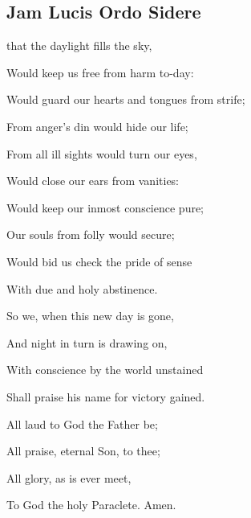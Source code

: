 \begin{multicols}{2}
\subsection{Jam Lucis Ordo Sidere}
\begin{hangparas}{1.25em}{1}
 that the daylight fills the sky,\par
{}\par\noindent
{}\par\noindent
Would keep us free from harm to-day:\\
\par\noindent
Would guard our hearts and tongues from strife;\par\noindent
From anger's din would hide our life;\par\noindent
From all ill sights would turn our eyes,\par\noindent
Would close our ears from vanities:\\
\par\noindent
Would keep our inmost conscience pure;\par\noindent
Our souls from folly would secure;\par\noindent
Would bid us check the pride of sense\par\noindent
With due and holy abstinence.\\
\par\noindent
So we, when this new day is gone,\par\noindent
And night in turn is drawing on,\par\noindent
With conscience by the world unstained\par\noindent
Shall praise his name for victory gained.\\
\par\noindent
All laud to God the Father be;\par\noindent
All praise, eternal Son, to thee;\par\noindent
All glory, as is ever meet,\par\noindent
To God the holy Paraclete. Amen.\\
\end{hangparas}


\end{multicols}

